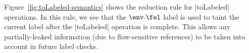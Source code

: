 Figure~\ref{fig:toLabeled-semantics} shows the reduction rule for
|toLabeled| operations. In this rule, we see that the $\env.\fel$
label is used to taint the current label after the |toLabeled|
operation is complete. This allows any partially-leaked information
(due to flow-sensitive references) to be taken into account in future
label checks.
